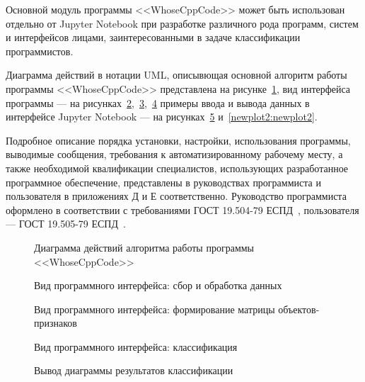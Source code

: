 Основной модуль программы <<WhoseCppCode>> может быть использован отдельно от Jupyter Notebook 
при разработке различного рода программ, систем и интерфейсов лицами, заинтересованными в задаче
классификации программистов.

Диаграмма действий в нотации UML, описывющая основной алгоритм работы программы <<WhoseCppCode>>
представлена на рисунке~\ref{flowchart:flowchart}, вид интерфейса программы --- 
на рисунках~\ref{user_notebook_1:user_notebook_1},~\ref{user_notebook_2:user_notebook_2},~\ref{user_notebook_3:user_notebook_3}
примеры ввода и вывода данных в интерфейсе Jupyter 
Notebook --- на рисунках~\ref{newplot:newplot} и~\ref{newplot2:newplot2}.

Подробное описание порядка установки, настройки, использования программы,
выводимые сообщения, требования к автоматизированному рабочему месту, а также
необходимой квалификации специалистов, использующих разработанное программное обеспечение,
представлены в руководствах программиста и пользователя в приложениях Д и Е соответственно.
Руководство программиста оформлено в соответствии с требованиями ГОСТ 19.504-79 ЕСПД~\cite{gost_19.504},
пользователя --- ГОСТ 19.505-79 ЕСПД~\cite{gost_19.505}.

\begin{figure}[h!]
\caption{ Диаграмма действий алгоритма работы программы <<WhoseCppCode>> }
\label{flowchart:flowchart}
\end{figure}


\begin{figure}[h!]
\caption{ Вид программного интерфейса: сбор и обработка данных }
\label{user_notebook_1:user_notebook_1}
\end{figure}


\begin{figure}[h!]
\caption{ Вид программного интерфейса: формирование матрицы объектов-признаков }
\label{user_notebook_2:user_notebook_2}
\end{figure}

\begin{figure}[h!]
\caption{ Вид программного интерфейса: классификация }
\label{user_notebook_3:user_notebook_3}
\end{figure}


\begin{figure}[h!]
\caption{ Вывод диаграммы результатов классификации }
\label{newplot:newplot}
\end{figure}

